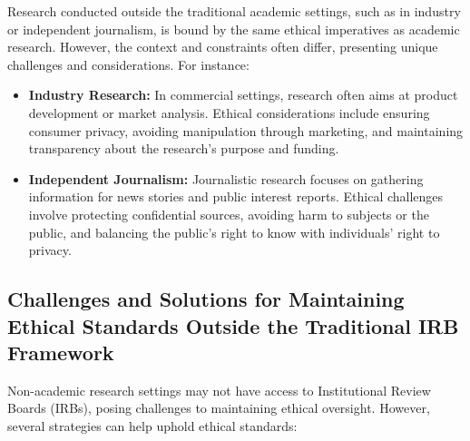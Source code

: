 \documentclass[
]{book}
\providecommand{\tightlist}{%
  \setlength{\itemsep}{0pt}\setlength{\parskip}{0pt}}
\begin{document}
Research conducted outside the traditional academic settings, such as in industry or independent journalism, is bound by the same ethical imperatives as academic research. However, the context and constraints often differ, presenting unique challenges and considerations. For instance:

\begin{itemize}
\tightlist
\item
  \textbf{Industry Research:} In commercial settings, research often aims at product development or market analysis. Ethical considerations include ensuring consumer privacy, avoiding manipulation through marketing, and maintaining transparency about the research's purpose and funding.
\item
  \textbf{Independent Journalism:} Journalistic research focuses on gathering information for news stories and public interest reports. Ethical challenges involve protecting confidential sources, avoiding harm to subjects or the public, and balancing the public's right to know with individuals' right to privacy.
\end{itemize}

\hypertarget{challenges-and-solutions-for-maintaining-ethical-standards-outside-the-traditional-irb-framework}{%
\subsection*{Challenges and Solutions for Maintaining Ethical Standards Outside the Traditional IRB Framework}\label{challenges-and-solutions-for-maintaining-ethical-standards-outside-the-traditional-irb-framework}}

Non-academic research settings may not have access to Institutional Review Boards (IRBs), posing challenges to maintaining ethical oversight. However, several strategies can help uphold ethical standards:
\end{document}
